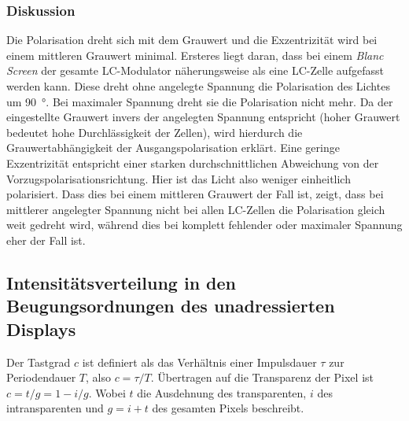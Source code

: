 \documentclass[
	a4paper,
	12pt,
	pagesize,
	ngerman
]{scrartcl}
\begin{document}
			\subsubsection*{Diskussion}
			Die Polarisation dreht sich mit dem Grauwert und die Exzentrizität wird bei einem mittleren Grauwert minimal.
			Ersteres liegt daran, dass bei einem \textit{Blanc Screen} der gesamte LC-Modulator näherungsweise als eine LC-Zelle aufgefasst werden kann.
			Diese dreht ohne angelegte Spannung die Polarisation des Lichtes um \SI{90}{\degree}.
			Bei maximaler Spannung dreht sie die Polarisation nicht mehr.
			Da der eingestellte Grauwert invers der angelegten Spannung entspricht (hoher Grauwert bedeutet hohe Durchlässigkeit der Zellen), wird hierdurch die Grauwertabhängigkeit der Ausgangspolarisation erklärt.
			Eine geringe Exzentrizität entspricht einer starken durchschnittlichen Abweichung von der Vorzugspolarisationsrichtung.
			Hier ist das Licht also weniger einheitlich polarisiert.
			Dass dies bei einem mittleren Grauwert der Fall ist, zeigt, dass bei mittlerer angelegter Spannung nicht bei allen LC-Zellen die Polarisation gleich weit gedreht wird, während dies bei komplett fehlender oder maximaler Spannung eher der Fall ist.

		\subsection{Intensitätsverteilung in den Beugungsordnungen des unadressierten Displays}

		Der Tastgrad $c$ ist definiert als das Verhältnis einer Impulsdauer $\tau$ zur Periodendauer $T$, also $c=\tau/T$.
		Übertragen auf die Transparenz der Pixel ist $c=t/g=1-i/g$.
		Wobei $t$ die Ausdehnung des transparenten, $i$ des intransparenten und $g=i+t$ des gesamten Pixels beschreibt.
\end{document}
